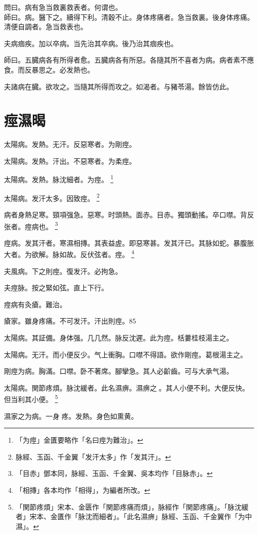 問曰。病有急当救裏救表者。何谓也。\\
師曰。病。醫下之。續得下利。清穀不止。身体疼痛者。急当救裏。後身体疼痛。清便自調者。急当救表也。

夫病痼疾。加以卒病。当先治其卒病。後乃治其痼疾也。

師曰。五臓病各有所得者愈。五臓病各有所惡。各隨其所不喜者为病。病者素不應食。而反暴思之。必发熱也。

夫諸病在臓。欲攻之。当隨其所得而攻之。如渴者。与豬苓湯。餘皆仿此。

\chapter{痙濕暍}

太陽病。发熱。无汗。反惡寒者。为剛痙。

太陽病。发熱。汗出。不惡寒者。为柔痙。

太陽病。发熱。脉沈細者。为痙。
	\footnote{「为痙」金匱要略作「名曰痙为難治」。}

太陽病。发汗太多。因致痙。
	\footnote{脉經、玉函、千金翼「发汗太多」作「发其汗」。}

病者身熱足寒。頸項强急。惡寒。时頭熱。面赤。目赤。獨頭動搖。卒口噤。背反张者。痙病也。
	\footnote{「目赤」鄧本同，脉經、玉函、千金翼、吳本均作「目脉赤」。}

痙病。发其汗者。寒濕相摶。其表益虗。即惡寒甚。发其汗已。其脉如蛇。暴腹胀大者。为欲解。脉如故。反伏弦者。痙。
	\footnote{「相摶」各本均作「相得」，为編者所改。}

夫風病。下之則痙。復发汗。必拘急。

夫痙脉。按之緊如弦。直上下行。

痙病有灸瘡。難治。

瘡家。雖身疼痛。不可发汗。汗出則痙。85

太陽病。其証備。身体强。几几然。脉反沈遲。此为痙。栝蔞桂枝湯主之。

太陽病。无汗。而小便反少。气上衝胸。口噤不得語。欲作剛痙。葛根湯主之。

{\khaaitp 剛}痙为病。胸滿。口噤。卧不著席。腳攣急。其人必齘齒。可与大承气湯。

太陽病。関節疼煩。脉沈緩者。此名濕痹。濕痹之{\sungtpii 𠊱}。其人小便不利。大便反快。但当利其小便。
	\footnote{
		「関節疼煩」宋本、金匮作「関節疼痛而煩」，脉經作「関節疼痛」。「脉沈緩者」宋本、金匱作「脉沈而細者」。「此名濕痹」脉經、玉函、千金翼作「为中濕」。
	}

濕家之为病。一身{\sungtpii 𥁞}疼。发熱。身色如熏黄。

